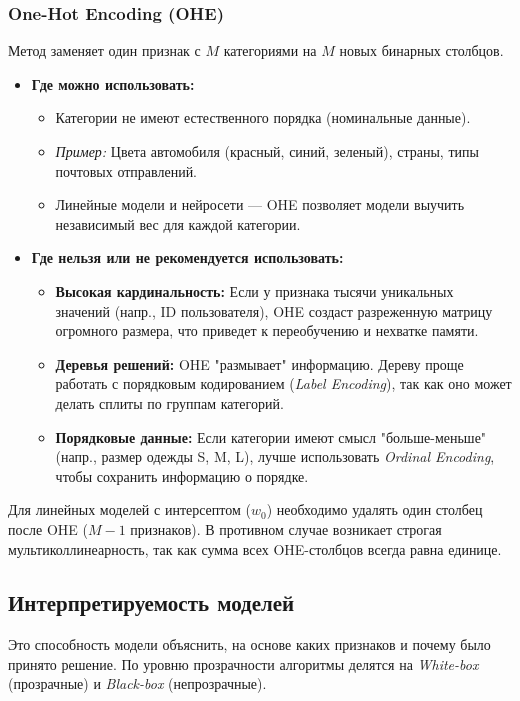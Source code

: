 \documentclass[12pt]{article}
\begin{document}
\subsubsection{One-Hot Encoding (OHE)}
Метод заменяет один признак с $M$ категориями на $M$ новых бинарных столбцов.
\begin{itemize}
    \item \textbf{Где можно использовать:}
    \begin{itemize}
        \item Категории не имеют естественного порядка (номинальные данные). 
        \item \textit{Пример:} Цвета автомобиля (красный, синий, зеленый), страны, типы почтовых отправлений.
        \item Линейные модели и нейросети — OHE позволяет модели выучить независимый вес для каждой категории.
    \end{itemize}
    \item \textbf{Где нельзя или не рекомендуется использовать:}
    \begin{itemize}
        \item \textbf{Высокая кардинальность:} Если у признака тысячи уникальных значений (напр., ID пользователя), OHE создаст разреженную матрицу огромного размера, что приведет к переобучению и нехватке памяти.
        \item \textbf{Деревья решений:} OHE "размывает" информацию. Дереву проще работать с порядковым кодированием (\textit{Label Encoding}), так как оно может делать сплиты по группам категорий.
        \item \textbf{Порядковые данные:} Если категории имеют смысл "больше-меньше" (напр., размер одежды S, M, L), лучше использовать \textit{Ordinal Encoding}, чтобы сохранить информацию о порядке.
    \end{itemize}
\end{itemize}

\begin{tcolorbox}[colback=red!5!white,colframe=red!75!black,title=Dummy Variable Trap]
    Для линейных моделей с интерсептом ($w_0$) необходимо удалять один столбец после OHE ($M-1$ признаков). В противном случае возникает строгая мультиколлинеарность, так как сумма всех OHE-столбцов всегда равна единице.
\end{tcolorbox}

\subsection{Интерпретируемость моделей}
Это способность модели объяснить, на основе каких признаков и почему было принято решение. По уровню прозрачности алгоритмы делятся на \textit{White-box} (прозрачные) и \textit{Black-box} (непрозрачные).
\end{document}
